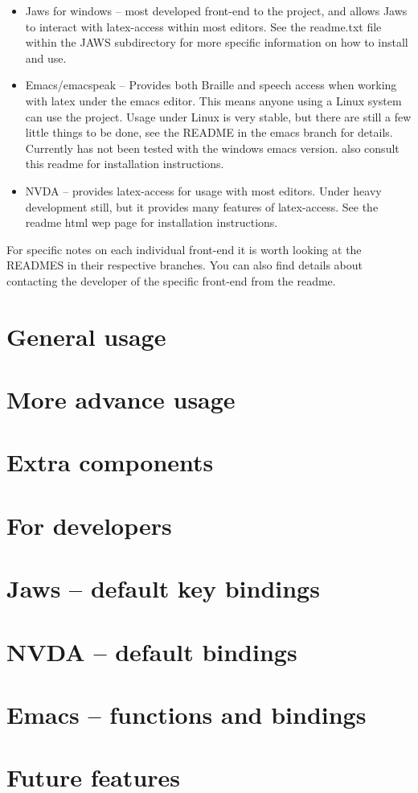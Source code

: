 \documentclass[12pt,a4paper]{report}
\begin{document}
\begin{itemize}
\item Jaws for windows -- most developed front-end to the project, and
  allows Jaws to interact with latex-access within most editors. See the readme.txt file within the JAWS subdirectory for more specific information on how to install and use.
\item Emacs/emacspeak -- Provides both Braille and speech access when
    working with latex under the emacs editor. This means anyone using a
    Linux system can use the project. Usage under Linux is very stable,
    but there are still a few little things to be done, see the README
    in the emacs branch for details. Currently has not been tested with
    the windows emacs version. also consult this readme for
    installation instructions.
\item NVDA -- provides latex-access for usage with most
      editors. Under heavy development still, but it provides many
      features of latex-access. See the readme html wep page for installation instructions.
\end{itemize}

For specific notes on each individual front-end it is worth looking at the
READMES in their respective branches. You can also find details about
contacting the developer of the specific front-end from the readme.

\chapter{General usage}
\label{ch-general-usage}
\chapter{More advance usage}
\label{ch-more-advanced-usage}
\chapter{Extra components}
\label{ch-extra-components}
\chapter{For developers}
\label{ch-for-developers}

\appendix
\chapter{Jaws -- default key bindings}
\label{ap-jaws}
\chapter{NVDA -- default bindings}
\label{ap-nvda}
\chapter{Emacs -- functions and bindings}
\label{AP-emacs}
\chapter{Future features}
\label{AP-future}
\end{document}
